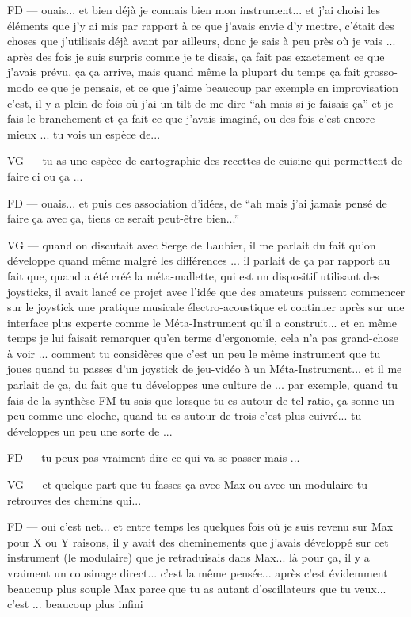 FD — ouais... et bien déjà je connais bien mon instrument... et j'ai choisi les éléments que j'y ai mis par rapport à ce que j'avais envie d'y mettre, c'était des choses que j'utilisais déjà avant par ailleurs, donc je sais à peu près où je vais ... après des fois je suis surpris comme je te disais, ça fait pas exactement ce que j'avais prévu, ça ça arrive, mais quand même la plupart du temps ça fait grosso-modo ce que je pensais, et ce que j'aime beaucoup par exemple en improvisation c'est, il y a plein de fois où j'ai un tilt de me dire ``ah mais si je faisais ça'' et je fais le branchement et ça fait ce que j'avais imaginé, ou des fois c'est encore mieux ... tu vois un espèce de... 

VG — tu as une espèce de cartographie des recettes de cuisine qui permettent de faire ci ou ça ... 

FD — ouais... et puis des association d'idées, de ``ah mais j'ai jamais pensé de faire ça avec ça, tiens ce serait peut-être bien...''  

VG — quand on discutait avec Serge de Laubier, il me parlait du fait qu'on développe quand même malgré les différences ... il parlait de ça par rapport au fait que, quand a été créé la méta-mallette, qui est un dispositif utilisant des joysticks, il avait lancé ce projet avec l'idée que des amateurs puissent commencer sur le joystick une pratique musicale électro-acoustique et continuer après sur une interface plus experte comme le Méta-Instrument qu'il a construit... et en même temps je lui faisait remarquer qu'en terme d'ergonomie, cela n'a pas grand-chose à voir ... comment tu considères que c'est un peu le même instrument que tu joues quand tu passes d'un joystick de jeu-vidéo à un Méta-Instrument... et il me parlait de ça, du fait que tu développes une culture de ... par exemple, quand tu fais de la synthèse FM tu sais que lorsque tu es autour de tel ratio, ça sonne un peu comme une cloche, quand tu es autour de trois c'est plus cuivré... tu développes un peu une sorte de ... 

FD — tu peux pas vraiment dire ce qui va se passer mais ... 

VG — et quelque part que tu fasses ça avec Max ou avec un modulaire tu retrouves des chemins qui... 

FD — oui c'est net... et entre temps les quelques fois où je suis revenu sur Max pour X ou Y raisons, il y avait des cheminements que j'avais développé sur cet instrument (le modulaire) que je retraduisais dans Max... là pour ça, il y a vraiment un cousinage direct... c'est la même pensée... après c'est évidemment beaucoup plus souple Max parce que tu as autant d'oscillateurs que tu veux... c'est ... beaucoup plus infini 

